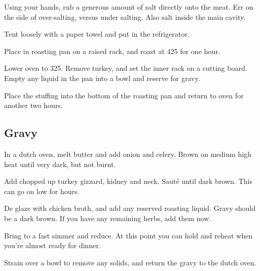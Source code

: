 \begin{recipe}
Using your hands, rub a generous amount of salt directly onto the meat. Err on the side of over-salting, versus under salting. Also salt inside the main cavity.

Tent loosely with a paper towel and put in the refrigerator.

Place in roasting pan on a raised rack, and roast at 425\degree{} for one hour.

Lower oven to 325\degree{}. Remove turkey, and set the inner rack on a cutting board. Empty any liquid in the pan into a bowl and reserve for gravy.

Place the stuffing into the bottom of the roasting pan and return to oven for another two hours.

\newpage
\subsection{Gravy}



In a dutch oven, melt butter and add onion and celery. Brown on medium high heat until very dark, but not burnt.

Add chopped up turkey gizzard, kidney and neck. Sauté until dark brown. This can go on low for hours.


De glaze with chicken broth, and add any reserved roasting liquid. Gravy should be a dark brown. If you have any remaining herbs, add them now.

Bring to a fast simmer and reduce. At this point you can hold and reheat when you're almost ready for dinner.

Strain over a bowl to remove any solids, and return the gravy to the dutch oven.



\end{recipe}
